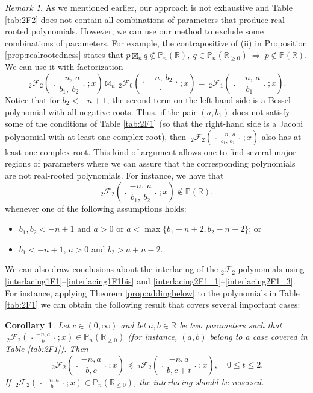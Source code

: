 \documentclass[reqno,11pt]{amsart}
\newtheorem{corollary}[theorem]{Corollary}
\theoremstyle{remark}
\newtheorem{remark}[theorem]{Remark}
\renewcommand{\P}{\mathbb{P}}
\newcommand{\rr}{\mathbb{R}}
\newcommand{\FF}{\mathcal{F}}
\newcommand*\pFq[5]{%
 {\ }_{#1}{\mathcal F}_{#2}{\left(\genfrac..{0pt}{}{#3}{#4};#5\right)}%
}
\begin{document}
\begin{remark}
As we mentioned earlier, our approach is not exhaustive and Table \ref{tab:2F2} does not contain all combinations of parameters that produce real-rooted polynomials. However,  we can use our method to exclude some combinations of parameters.  For example, the contrapositive of (ii) in Proposition \ref{prop:realrootedness} states that $p\boxtimes_n q\notin \P_n(\rr),\ q\in \P_n(\rr_{\geq 0}) \ \Rightarrow \ p\notin \P(\rr)$. We can use it with factorization 
\begin{equation}
    \pFq{2}{2}{-n,\ a}{b_1,\ b_2}{x}\boxtimes_n \pFq{2}{0}{-n,\  b_2}{\cdot }{x}=\pFq{2}{1}{-n,\ a}{b_1}{x}.
\end{equation}
Notice that for $b_2 <-n+1$, the second term on the left-hand side is a Bessel polynomial with all negative roots. Thus, if the pair $(a, b_1)$ does not satisfy some of the conditions of Table \ref{tab:2F1} (so that the right-hand side is a Jacobi polynomial with at least one complex root), then $\pFq{2}{2}{-n,\ a}{b_1,\ b_2}{x}$ also has at least one complex root. This kind of argument allows one to find several major regions of parameters where we can assure that the corresponding polynomials are not real-rooted polynomials. For instance, we have that
$$\pFq{2}{2}{-n,\ a}{b_1,\ b_2}{x} \notin \P(\rr),$$
whenever one of the following assumptions holds:
\begin{itemize}
    \item $b_1, b_2 <-n+1$ and $a >0$ or $a<\max\{b_1-n+2,b_2-n+2\}$; or
    \item $b_1 <-n+1$, $a >0$ and  $b_2>a+n-2$.
\end{itemize}
\end{remark}

We can also draw conclusions about the interlacing of the ${}_2\FF_2$ polynomials using \eqref{interlacing1F1}--\eqref{interlacing1F1bis} and \eqref{interlacing2F1_1}--\eqref{interlacing2F1_3}. For instance, applying Theorem \ref{prop:addingbelow} to the polynomials in Table \ref{tab:2F1} we can obtain the following result that covers several important cases:
\begin{corollary}
Let $c \in (0,\infty)$ and let $a,b\in \rr$ be two parameters such that $\pFq{2}{2}{-n, a}{ b}{x}\in \P_n(\rr_{\ge 0})$ (for instance,  $(a,b)$ belong to a case covered in Table \ref{tab:2F1}). Then 
$$
\pFq{2}{2}{-n,  a}{ b, c}{x} \preccurlyeq \pFq{2}{2}{-n,  a}{ b, c+t}{x}, \quad 0\leq t\leq 2.
$$
If $\pFq{2}{2}{-n, a}{ b}{x}\in \P_n(\rr_{\le 0})$, the interlacing should be reversed.
\end{corollary}
\end{document}
